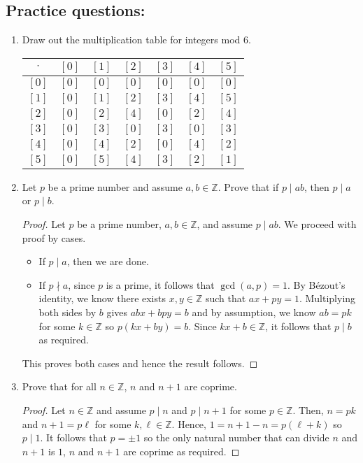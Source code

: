 \documentclass[letterpaper,12pt]{article}
\begin{document}
\subsection*{Practice questions:}
\begin{enumerate}
\item Draw out the multiplication table for integers mod $6$. \par \centering
\begin{tabular}{|c|c|c|c|c|c|c|}
\hline
   $\cdot$  & $[0]$ & $[1]$ & $[2]$ & $[3]$ & $[4]$ & $[5]$  \\
   \hline
   $[0]$  & $[0]$  & $[0]$  & $[0]$  & $[0]$  & $[0]$  & $[0]$  \\
   \hline
   $[1]$ & $[0]$ & $[1]$ & $[2]$ & $[3]$ & $[4]$ & $[5]$ \\
   \hline
   $[2]$ & $[0]$ & $[2]$ & $[4]$ & $[0]$ & $[2]$ & $[4]$ \\
   \hline
   $[3]$ & $[0]$ & $[3]$ & $[0]$ & $[3]$ & $[0]$ & $[3]$ \\
   \hline
   $[4]$ & $[0]$ & $[4]$ & $[2]$ & $[0]$ & $[4]$ & $[2]$ \\
   \hline
   $[5]$ & $[0]$ & $[5]$ & $[4]$ & $[3]$ & $[2]$ & $[1]$ \\
   \hline
\end{tabular}
\item \justifying Let $p$ be a prime number and assume $a,b \in \mathbb{Z}$. Prove that if $p \mid ab$, then $p \mid a$ or $p \mid b$.
\begin{proof}
     Let $p$ be a prime number, $a,b \in \mathbb{Z}$, and assume $p \mid ab$. We proceed with proof by cases. \begin{itemize}
         \item If $p \mid a$, then we are done.
         \item If $p \nmid a$, since $p$ is a prime, it follows that $\gcd (a,p) = 1$. By Bézout's identity, we know there exists $x,y \in \mathbb{Z}$ such that $ax + py = 1$. Multiplying both sides by $b$ gives $abx + bpy =b$ and by assumption, we know $ab = pk$ for some $k \in \mathbb{Z}$ so $p(kx + by) = b $. Since $kx + b \in \mathbb{Z}$, it follows that $p \mid b$ as required.
     \end{itemize}
     This proves both cases and hence the result follows.
\end{proof}
\item Prove that for all $n \in \mathbb{Z}$, $n$ and $n+1$ are coprime.
\begin{proof}
    Let $n \in \mathbb{Z}$ and assume $p \mid n$ and $p \mid n+1$ for some $p \in \mathbb{Z}$. Then, $n = pk$ and $n+1 = p\ell$ for some $k, \ell \in \mathbb{Z}$. Hence, $1= n+1 - n = p(\ell + k)$ so $p \mid 1$. It follows that $p = \pm 1$ so the only natural number that can divide $n$ and $n+1$ is $1$, $n$ and $n+1$ are coprime as required.

\end{proof}
\end{enumerate}
\end{document}
